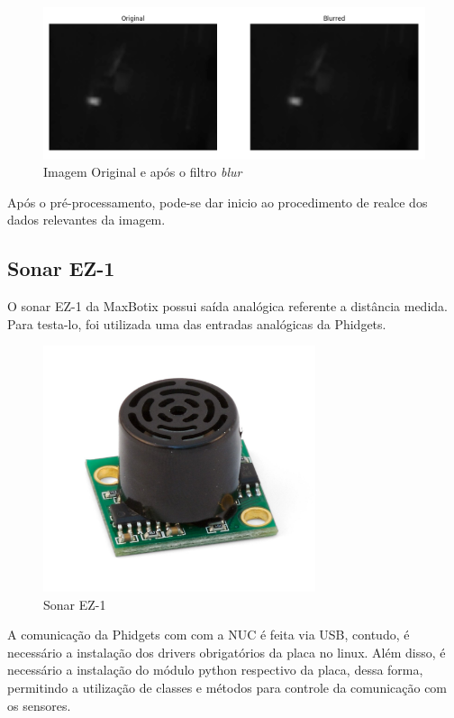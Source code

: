 		\begin{figure}[!ht]
		   \centering
		   \includegraphics[width=16cm]{Figures/blur.png}
		   \caption{Imagem Original e após o filtro \textit{blur}}
		   \label{fig:blur}
		\end{figure}
		
		Após o pré-processamento, pode-se dar inicio ao procedimento de realce dos dados relevantes da imagem.
	
	\subsection{Sonar EZ-1}
		O sonar EZ-1 da MaxBotix possui saída analógica referente a distância medida. Para testa-lo, foi utilizada uma das entradas analógicas da Phidgets.
		
		\pagebreak
		
		\begin{figure}[!ht]
		   \centering
		   \includegraphics[width=8cm]{Figures/ez1.jpg}
		   \caption{Sonar EZ-1}
		   \label{fig:ez1}
		\end{figure}
		
		A comunicação da Phidgets com com a NUC é feita via USB, contudo, é necessário a instalação dos drivers obrigatórios da placa no linux. Além disso, é necessário a instalação do módulo python respectivo da placa, dessa forma, permitindo a utilização de classes e métodos para controle da comunicação com os sensores.
		
